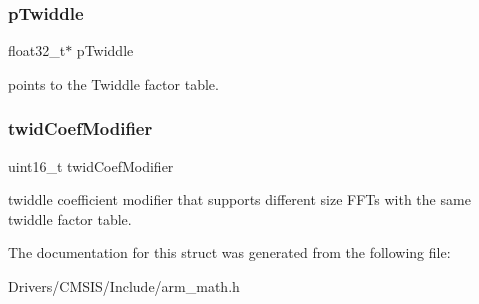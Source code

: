 \subsubsection{\texorpdfstring{p\+Twiddle}{pTwiddle}}
{\footnotesize\ttfamily float32\+\_\+t$\ast$ p\+Twiddle}

points to the Twiddle factor table. \mbox{\label{structarm__cfft__radix2__instance__f32_afe772e5b5001c9d8e85032115a8df5bf}} 
\subsubsection{\texorpdfstring{twid\+Coef\+Modifier}{twidCoefModifier}}
{\footnotesize\ttfamily uint16\+\_\+t twid\+Coef\+Modifier}

twiddle coefficient modifier that supports different size F\+F\+Ts with the same twiddle factor table. 

The documentation for this struct was generated from the following file\+:\begin{DoxyCompactItemize}
\item 
Drivers/\+C\+M\+S\+I\+S/\+Include/arm\+\_\+math.\+h\end{DoxyCompactItemize}
